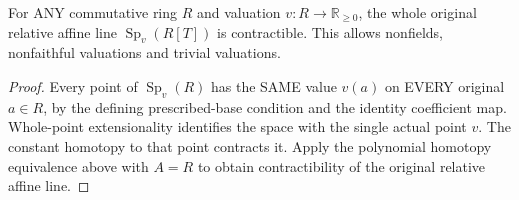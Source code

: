\begin{corollary}
\label{analytic:valued-ring-affine-line-contractible}
\leanok
{}
For ANY commutative ring $R$ and valuation $v:R\to\mathbb R_{\geq0}$,
the whole original relative affine line $\operatorname{Sp}_v(R[T])$ is
contractible. This allows nonfields, nonfaithful valuations and trivial
valuations.
\end{corollary}
\begin{proof}
Every point of $\operatorname{Sp}_v(R)$ has the SAME value $v(a)$ on
EVERY original $a\in R$, by the defining prescribed-base condition and
the identity coefficient map. Whole-point extensionality identifies the
space with the single actual point $v$. The constant homotopy to that
point contracts it. Apply the polynomial homotopy equivalence above with
$A=R$ to obtain contractibility of the original relative affine line.
\end{proof}
